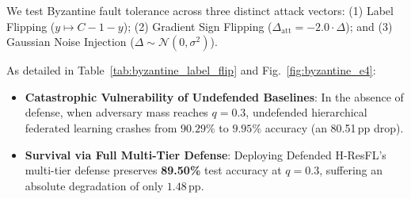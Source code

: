 \documentclass[sigconf]{acmart}
\begin{document}
\begin{table}[t]
\centering
\caption{\textbf{Byzantine Fault Tolerance under Label-Flipping Attacks on CIFAR-10 ResNet-9 across Topologies ($N=30, K=5, 50$ Rounds).}}
\label{tab:byzantine_label_flip}
\vspace{1.5mm}
\end{table}

We test Byzantine fault tolerance across three distinct attack vectors: (1) Label Flipping ($y \mapsto C - 1 - y$); (2) Gradient Sign Flipping ($\Delta_{\text{att}} = -2.0 \cdot \Delta$); and (3) Gaussian Noise Injection ($\Delta \sim \mathcal{N}(0, \sigma^2)$).

As detailed in Table~\ref{tab:byzantine_label_flip} and Fig.~\ref{fig:byzantine_e4}:
\begin{itemize}
    \item \textbf{Catastrophic Vulnerability of Undefended Baselines}: In the absence of defense, when adversary mass reaches $q=0.3$, undefended hierarchical federated learning crashes from $90.29\%$ to $9.95\%$ accuracy (an 80.51\,pp drop).
    \item \textbf{Survival via Full Multi-Tier Defense}: Deploying Defended H-ResFL's multi-tier defense preserves \textbf{89.50\%} test accuracy at $q=0.3$, suffering an absolute degradation of only $1.48$\,pp.
\end{itemize}
\end{document}
